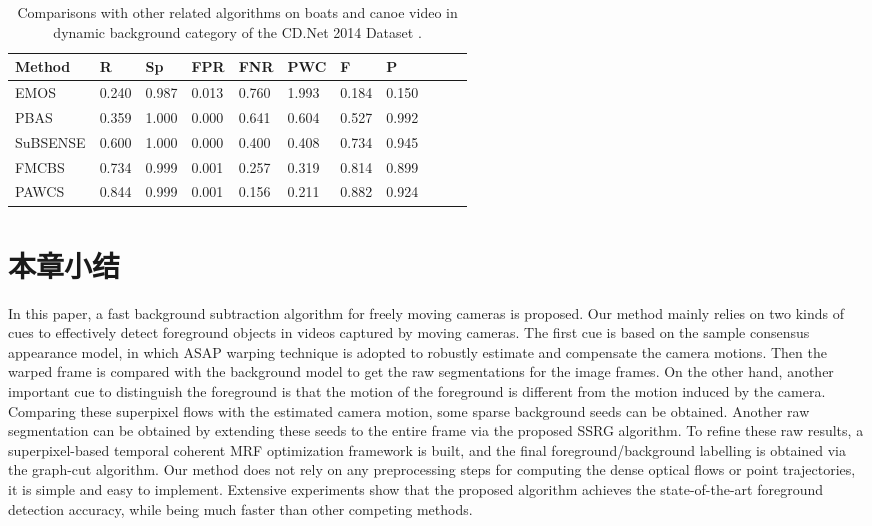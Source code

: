  \begin{table}[ht]
\caption{Comparisons with other related algorithms on boats and canoe video in dynamic background category of the CD.Net 2014 Dataset \cite{CD2014}.}
\label{tab:Comparisons on Dynamic backgrounds }
\begin{center}
\begin{tabular}{|l|l|l|l|l|l|l|l|l|l|l|} %
\hline
\rule[-1ex]{0pt}{3.5ex}  Method &R &Sp & FPR & FNR &PWC &F &P\\
\hline
\rule[-1ex]{0pt}{3.5ex}  EMOS\cite{Chien2002Efficient}&  0.240&0.987&0.013&0.760&1.993&0.184&0.150 \\
\hline
\rule[-1ex]{0pt}{3.5ex}  PBAS\cite{pbas}&0.359&1.000&0.000&0.641&0.604&0.527&0.992  \\
\hline
\rule[-1ex]{0pt}{3.5ex}  SuBSENSE\cite{subsenseTIP}&  0.600&1.000&0.000&0.400&0.408&0.734&0.945 \\
\hline
\rule[-1ex]{0pt}{3.5ex}  FMCBS &  0.734 & 0.999 & 0.001 & 0.257 &0.319&0.814&0.899\\
\hline
\rule[-1ex]{0pt}{3.5ex}  PAWCS\cite{Stcharles2015A}&0.844&0.999&0.001&0.156&0.211&0.882&0.924\\
\hline
\end{tabular}
\end{center}
\end{table}
 \section{本章小结}
 \label{ch4:sec:conclusions}
 In this paper, a fast background subtraction algorithm for freely moving cameras is proposed. Our method mainly relies on two kinds of cues to effectively detect foreground objects in videos captured by moving cameras. The first cue is based on the sample consensus appearance model, in which ASAP warping technique is adopted to robustly estimate and compensate the camera motions. Then the warped frame is compared with the background model to get the raw segmentations for the image frames. On the other hand, another important cue to distinguish the foreground is that the motion of the foreground is different from the motion induced by the camera. Comparing these superpixel flows with the estimated camera motion, some sparse background seeds can be obtained. Another raw segmentation can be obtained by extending these seeds to the entire frame via the proposed SSRG algorithm.  To refine these raw results, a superpixel-based  temporal coherent MRF optimization framework is built, and the final foreground/background labelling is obtained via the graph-cut algorithm. Our method does not rely on any preprocessing steps for computing the dense optical flows or point trajectories, it is simple and easy to implement. Extensive experiments show that the proposed algorithm achieves the state-of-the-art foreground detection accuracy, while being much faster than other competing methods. 
